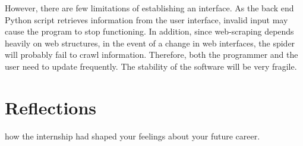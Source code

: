 \documentclass[12pt]{report}
\begin{document}
However, there are few limitations of establishing an interface. As the back end Python script retrieves information from the user interface, invalid input may cause the program to stop functioning. In addition, since web-scraping depends heavily on web structures, in the event of a change in web interfaces, the spider will probably fail to crawl information. Therefore, both the programmer and the user need to update frequently. The stability of the software will be very fragile.

\chapter{Reflections}

how the internship had shaped your feelings about your future career.

\newpage
\begin{appendices}
\printglossaries
\end{appendices}
\end{document}
